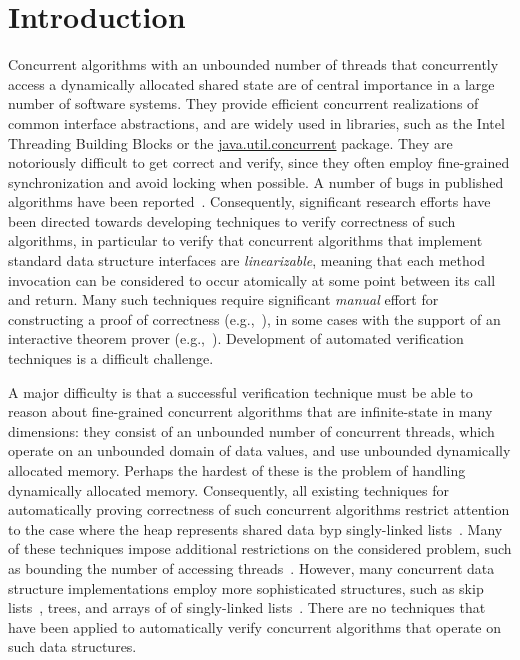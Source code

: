 \section{Introduction}



Concurrent algorithms with an unbounded number of
threads that concurrently access a dynamically allocated shared state
are of central importance in a large number of software systems.
They provide efficient concurrent realizations of
common interface abstractions, and
are widely used in libraries,
such as the Intel Threading Building Blocks or
the \url{java.util.concurrent} package.
They are notoriously difficult to get correct and verify, since they
often employ fine-grained synchronization and avoid locking when
possible. A number of bugs  in published
algorithms have been reported~\cite{DDGJLMMSS:dcas,MiSc:correction}.
Consequently, significant research efforts have been directed towards developing
techniques to verify correctness of such algorithms, in particular
to verify that concurrent algorithms that implement standard data structure
interfaces are {\em linearizable}, meaning that
each method invocation can be considered to occur atomically at some point
between its call and return.
Many such techniques require significant {\em manual} effort for
constructing a proof of correctness
(e.g.,~\cite{LF:pldi13,Vafeiadis:Thesis}),
in some cases with the support of an interactive theorem prover
(e.g.,~\cite{Aaron:locigcal:linearizability,Colvin:Lazy-List,Derrick:fm14,SWD:cav12,SDW:tcl14}).
Development of automated verification techniques is a difficult challenge.

A major difficulty is that a successful verification technique must be
able to reason about fine-grained concurrent algorithms that are infinite-state
in many dimensions: 
they consist of an unbounded number of concurrent threads, which
operate on an unbounded domain of data values, and use
unbounded dynamically allocated memory. 
Perhaps the hardest of these is the problem of handling
dynamically allocated memory.
Consequently, all existing techniques for automatically proving correctness
of such concurrent algorithms restrict attention to the case where
the heap represents shared data byp singly-linked
lists~\cite{AHHR:integrated,meyer:vmcai16,Quy:sas16,Sagiv:correlation,Vafeiadis:cav10}. Many of these techniques impose additional restrictions on the considered problem, such as bounding the number of accessing
threads~\cite{Amit:comparisonAbstraction,Vechev:spin09,CernyRZCA:CAV10}.
However, many concurrent data structure implementations employ more
sophisticated structures, such as skip
lists~\cite{Fomitchev:2004,ArtOfMpP,Sundell:2005}, trees, and arrays of
of singly-linked lists~\cite{ts-stack}.  There are no
techniques that have been applied to automatically verify concurrent algorithms
that operate on such data structures.


